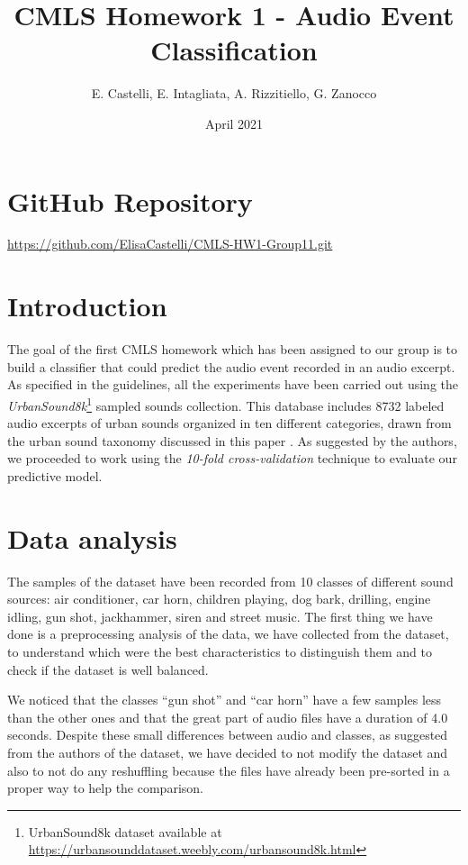 \documentclass[letterpaper, 12pt]{article}
\begin{document}
	
	\title{CMLS Homework 1 - Audio Event Classification}
	\author{E. Castelli, E. Intagliata, A. Rizzitiello, G. Zanocco}
	\date{April 2021}
	\maketitle
	
	\section{GitHub Repository}
	\url{https://github.com/ElisaCastelli/CMLS-HW1-Group11.git}
	
	\section{Introduction}
	The goal of the first CMLS homework which has been assigned to our group is to build a classifier that could predict the audio event recorded in an audio excerpt. As specified in the guidelines, all the experiments have been carried out using the \textit{UrbanSound8k}\footnote{UrbanSound8k dataset available at \url{https://urbansounddataset.weebly.com/urbansound8k.html}} sampled sounds collection. This database includes 8732 labeled audio excerpts of urban sounds organized in ten different categories, drawn from the urban sound taxonomy discussed in this paper \cite{sal14}. As suggested by the authors, we proceeded to work using the \textit{10-fold cross-validation} technique to evaluate our predictive model.
	
	
	\section{Data analysis}
	The samples of the dataset have been recorded from 10 classes of different sound sources: air conditioner, car horn, children playing, dog bark, drilling, engine idling, gun shot, jackhammer, siren and street music. The first thing we have done is a preprocessing analysis of the data, we have collected from the dataset, to understand which were the best characteristics to distinguish them and to check if the dataset is well balanced.
	
	We noticed that the classes “gun shot” and “car horn” have a few samples less than the other ones and that the great part of audio files have a duration of 4.0 seconds. Despite these small differences between audio and classes, as suggested from the authors of the dataset, we have decided to not modify the dataset and also to not do any reshuffling because the files have already been pre-sorted in a proper way to help the comparison.
	
\end{document}
